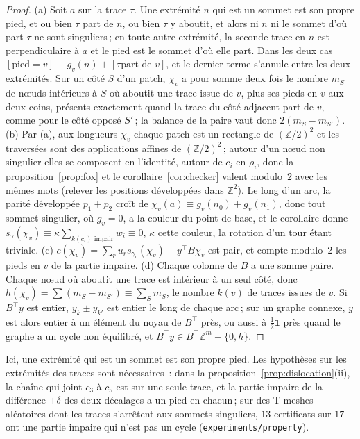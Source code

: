 \documentclass[11pt,a4paper]{article}
\newcommand{\Z}{\mathbb{Z}}
\newcommand{\shift}{s}
\begin{document}
\begin{proof}
(a) Soit $a$ sur la trace $\tau$. Une extrémité $n$ qui est un sommet est son
propre pied, et ou bien $\tau$ part de $n$, ou bien $\tau$ y aboutit, et alors
ni $n$ ni le sommet d'où part $\tau$ ne sont singuliers\,; en toute autre
extrémité, la
seconde trace en $n$ est perpendiculaire à $a$ et le pied est le sommet d'où
elle part. Dans les deux cas $[\text{pied} = v] \equiv g_v(n) + [\tau \text{
part de } v]$, et le dernier terme s'annule entre les deux extrémités. Sur un
côté $S$ d'un patch, $\chi_v$ a pour somme deux fois le nombre $m_S$ de nœuds
intérieurs à $S$ où aboutit une trace issue de $v$, plus ses pieds en $v$ aux
deux coins, présents exactement quand la trace du côté adjacent part de $v$,
comme pour le côté opposé $S'$\,; la balance de la paire vaut
donc $2(m_S - m_{S'})$. (b) Par (a), aux longueurs $\chi_v$ chaque patch est
un rectangle de $(\Z/2)^2$ et les traversées sont des applications affines de
$(\Z/2)^2$\,; autour d'un nœud non singulier elles se composent en
l'identité, autour de $c_i$ en $\rho_i$, donc la proposition~\ref{prop:fox} et
le corollaire~\ref{cor:checker} valent modulo~$2$ avec les mêmes mots (relever
les positions développées dans $\Z^2$). Le long d'un arc, la parité développée
$p_1 + p_2$ croît de $\chi_v(a) \equiv g_v(n_0) + g_v(n_1)$, donc tout sommet
singulier, où $g_v = 0$, a la couleur du point de base, et le corollaire donne
$\shift_\gamma(\chi_v) \equiv \kappa \sum_{k(c_i)\text{ impair}} w_i \equiv
0$, $\kappa$ cette couleur, la rotation d'un tour étant triviale. (c)
$c(\chi_v) = \sum_r u_r \shift_{\gamma_r}(\chi_v) + y^\top B\chi_v$ est pair,
et compte modulo~$2$ les pieds en $v$ de la partie impaire. (d) Chaque colonne
de $B$ a une somme paire. Chaque nœud où aboutit une trace est intérieur à un
seul côté, donc $h(\chi_v) = \sum (m_S - m_{S'}) \equiv \sum_S m_S$, le nombre
$k(v)$ de traces issues de $v$. Si $B^\top y$ est entier, $y_k \pm y_{k'}$ est
entier le long de chaque arc\,; sur un graphe connexe, $y$ est alors entier à
un élément du noyau de $B^\top$ près, ou aussi à $\frac12\mathbf 1$ près quand
le graphe a un cycle non équilibré, et $B^\top y \in B^\top\Z^m + \{0, h\}$.
\end{proof}

Ici, une extrémité qui est un sommet est son propre pied. Les hypothèses sur
les extrémités des traces sont nécessaires~: dans la
proposition~\ref{prop:dislocation}(ii), la chaîne qui joint $c_3$ à $c_5$ est
sur une seule trace, et la partie impaire de la différence $\pm\delta$ des
deux décalages a un pied en chacun\,; sur des T-meshes aléatoires dont les
traces s'arrêtent aux sommets singuliers, $13$ certificats sur $17$ ont une
partie impaire qui n'est pas un cycle (\texttt{experiments/property}).
\end{document}
